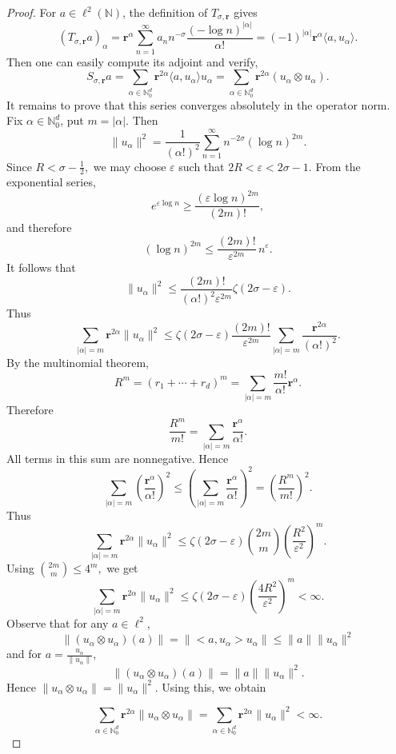 \documentclass[12pt, reqno]{amsart}
\numberwithin{equation}{section}
\begin{document}
\begin{proof}
For $a \in \ell^2(\mathbb{N})$, the definition of $T_{\sigma, \boldsymbol{r}}$ gives
\[
(T_{\sigma,\boldsymbol{r}}a)_{\alpha}
=
\boldsymbol{r}^{\alpha}
\sum_{n=1}^{\infty}
a_n n^{-\sigma}
\frac{(-\log n)^{|\alpha|}}{\alpha!}
= (-1)^{|\alpha|}\boldsymbol{r}^{\alpha}\langle a,u_{\alpha}\rangle.
\]
Then one can easily compute its adjoint and verify,
\[
S_{\sigma,\boldsymbol{r}}a
=
\sum_{\alpha\in\mathbb{N}_{0}^{d}}
\boldsymbol{r}^{2\alpha}\langle a,u_{\alpha}\rangle u_{\alpha}=\sum_{\alpha\in\mathbb{N}_{0}^{d}}
\boldsymbol{r}^{2\alpha}(u_{\alpha}\otimes u_{\alpha}).
\]
It remains to prove that this series converges absolutely in the operator norm.
Fix $\alpha\in \mathbb{N}_0^d$, put $m=|\alpha|.$ Then
\[
\|u_{\alpha}\|^{2}
=
\frac{1}{(\alpha!)^{2}}
\sum_{n=1}^{\infty}n^{-2\sigma}(\log n)^{2m}.
\]
Since $R<\sigma-\frac12,$ we may choose $\varepsilon$ such that
$2R<\varepsilon<2\sigma-1.$
From the exponential series,
\[
e^{\varepsilon\log n}
\ge
\frac{(\varepsilon\log n)^{2m}}{(2m)!},
\]
and therefore
\begin{equation}\label{eq:exp-inequality}
(\log n)^{2m}
\le
\frac{(2m)!}{\varepsilon^{2m}}\,n^\varepsilon.
\end{equation}
It follows that
\[
\|u_{\alpha}\|^{2}
\leq
\frac{(2m)!}{(\alpha!)^{2}\varepsilon^{2m}}
\zeta(2\sigma-\varepsilon).
\]
Thus
\[
\sum_{|\alpha|=m}
\boldsymbol{r}^{2\alpha}\|u_{\alpha}\|^{2}
\leq
\zeta(2\sigma-\varepsilon)
\frac{(2m)!}{\varepsilon^{2m}}
\sum_{|\alpha|=m}
\frac{\boldsymbol{r}^{2\alpha}}{(\alpha!)^{2}}.
\]
By the multinomial theorem,
\[
R^m
=
(r_1+\cdots+r_d)^m
=
\sum_{|\alpha|=m}
\frac{m!}{\alpha!}\boldsymbol{r}^{\alpha}.
\]
Therefore
\[
\frac{R^m}{m!}
=
\sum_{|\alpha|=m}
\frac{\boldsymbol{r}^{\alpha}}{\alpha!}.
\]
All terms in this sum are nonnegative. Hence
\[
\sum_{|\alpha|=m}
\left(\frac{\boldsymbol{r}^{\alpha}}{\alpha!}\right)^2
\leq
\left(
\sum_{|\alpha|=m}
\frac{\boldsymbol{r}^{\alpha}}{\alpha!}
\right)^2
=
\left(\frac{R^m}{m!}\right)^2.
\]
Thus
\[
\sum_{|\alpha|=m}
\boldsymbol{r}^{2\alpha}\|u_{\alpha}\|^{2}
\leq
\zeta(2\sigma-\varepsilon)
\binom{2m}{m}
\left(\frac{R^2}{\varepsilon^2}\right)^m.
\]
Using $\binom{2m}{m}\leq 4^m,$ we get
\begin{equation} \label{eq: summation bound}
\sum_{|\alpha|=m}
\boldsymbol{r}^{2\alpha}\|u_{\alpha}\|^{2}
\leq
\zeta(2\sigma-\varepsilon)
\left(\frac{4R^2}{\varepsilon^2}\right)^m<\infty.
\end{equation}
Observe that for any $a\in \ell^2$,
\[
\|(u_{\alpha}\otimes u_{\alpha})(a)\|=\|<a,u_{\alpha}>u_{\alpha}\|\leq \|a\|\|u_{\alpha}\|^2
\]
and for $a=\frac{u_{\alpha}}{\|u_{\alpha}\|}$,
\[
\|(u_{\alpha}\otimes u_{\alpha})(a)\|=\|a\|\|u_{\alpha}\|^2.
\]
Hence $\|u_{\alpha} \otimes u_{\alpha}\| = \|u_{\alpha}\|^2$. Using this, we obtain

\[
\sum_{\alpha\in\mathbb{N}_{0}^{d}}
\boldsymbol{r}^{2\alpha}\|u_{\alpha}\otimes u_{\alpha}\|
=
\sum_{\alpha\in\mathbb{N}_{0}^{d}}
\boldsymbol{r}^{2\alpha}\|u_{\alpha}\|^{2}
<\infty.
\]
\end{proof}
\end{document}
